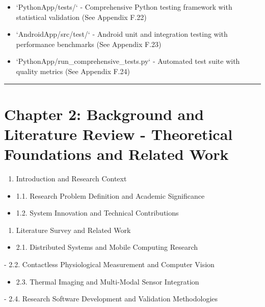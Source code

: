 \documentclass[11pt,a4paper]{report}
\begin{document}
\begin{itemize}
\item `PythonApp/tests/` - Comprehensive Python testing framework with statistical validation (See Appendix F.22)
\item `AndroidApp/src/test/` - Android unit and integration testing with performance benchmarks (See Appendix F.23)
\item `PythonApp/run_comprehensive_tests.py` - Automated test suite with quality metrics (See Appendix F.24)

\end{itemize}
\hrule

\section{Chapter 2: Background and Literature Review - Theoretical Foundations and Related Work}

\begin{enumerate}
\item Introduction and Research Context

\end{enumerate}
\begin{itemize}
\item 1.1. Research Problem Definition and Academic Significance
\item 1.2. System Innovation and Technical Contributions

\end{itemize}
\begin{enumerate}
\item Literature Survey and Related Work

\end{enumerate}
\begin{itemize}
\item 2.1. Distributed Systems and Mobile Computing Research
\end{itemize}
-
2.2. Contactless Physiological Measurement and Computer Vision
\begin{itemize}
\item 2.3. Thermal Imaging and Multi-Modal Sensor Integration
\end{itemize}
-
2.4. Research Software Development and Validation Methodologies
\end{document}
